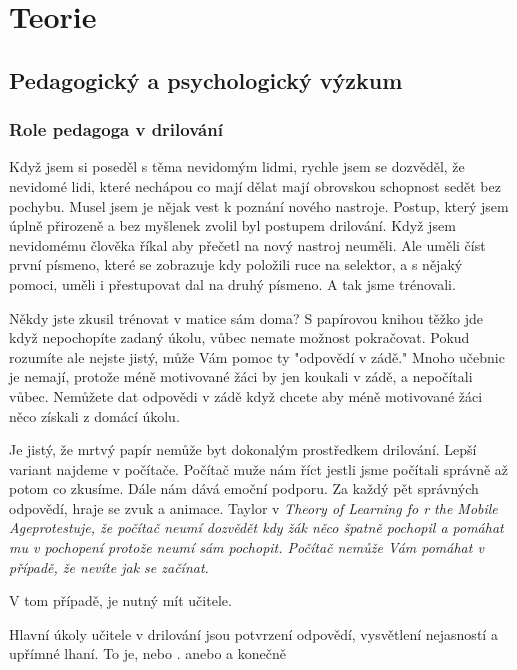 \chapter{Teorie}

\section{Pedagogický a psychologický výzkum}

\subsection{Role pedagoga v drilování}

Když jsem si poseděl s těma nevidomým lidmi, rychle jsem se dozvěděl, že nevidomé lidi, které nechápou co mají dělat mají obrovskou schopnost sedět bez pochybu.  Musel jsem je nějak vest k poznání nového nastroje.  Postup, který jsem úplně přirozeně a bez myšlenek zvolil byl postupem drilování.  Když jsem nevidomému člověka říkal aby přečetl na nový nastroj neuměli.  Ale uměli číst první písmeno, které se zobrazuje kdy položili ruce na selektor, a s nějaký pomoci, uměli i přestupovat dal na druhý písmeno.  A tak jsme trénovali.

Někdy jste zkusil trénovat v matice sám doma?  S papírovou knihou těžko jde když nepochopíte zadaný úkolu, vůbec nemate možnost pokračovat.  Pokud rozumíte ale nejste jistý, může Vám pomoc ty "odpovědí v zádě."  Mnoho učebnic je nemají, protože méně motivované žáci by jen koukali v zádě, a nepočítali vůbec.  Nemůžete dat odpovědi v zádě když chcete aby méně motivované žáci něco získali z domácí úkolu.

Je jistý, že mrtvý papír nemůže byt dokonalým prostředkem drilování.  Lepší variant najdeme v počítače.  Počítač muže nám říct jestli jsme počítali správně až potom co zkusíme.  Dále nám dává emoční podporu.  Za každý pět správných odpovědí, hraje se zvuk a animace. Taylor v \em Theory of Learning fo r the Mobile Age\em protestuje, že počítač neumí dozvědět kdy žák něco špatně pochopil a pomáhat mu v pochopení protože neumí sám pochopit\citep{taylor2010theory}. Počítač nemůže Vám pomáhat v případě, že nevíte jak se začínat.

V tom případě, je nutný mít učitele.

Hlavní úkoly učitele v drilování jsou potvrzení odpovědí, vysvětlení nejasností a upřímné lhaní.  To je,  nebo .  anebo  a konečně 


